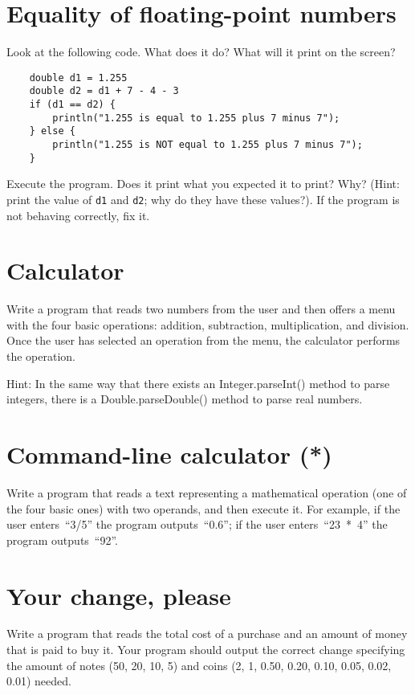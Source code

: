 \documentclass{article}
\begin{document}
\section{Equality of floating-point numbers}
\label{sec:eq}

Look at the following code. What does it do? What will it print on the screen?

\begin{verbatim}
    double d1 = 1.255
    double d2 = d1 + 7 - 4 - 3
    if (d1 == d2) {
        println("1.255 is equal to 1.255 plus 7 minus 7");
    } else {
        println("1.255 is NOT equal to 1.255 plus 7 minus 7");
    }
\end{verbatim}

Execute the program. Does it print what you expected it to print? Why?
(Hint: print the value of \verb+d1+ and \verb+d2+; why do they have
these values?). If the program is not behaving correctly, fix it. 

\section{Calculator}
\label{sec:calculator}

Write a program that reads two numbers from the user and then offers a
menu with the four basic operations: addition, subtraction,
multiplication, and division. Once the user has selected an operation
from the menu, the calculator performs the operation.

Hint: In the same way that there exists an Integer.parseInt() method
to parse integers, there is a Double.parseDouble() method to parse
real numbers. 

\section{Command-line calculator (*)}
\label{sec:comm-line-calc}

Write a program that reads a text representing a mathematical
operation (one of the four basic ones) with two operands, and then
execute it. For example, if the user enters~``3/5'' the program
outputs~``0.6''; if the user enters~``23~*~4'' the program
outputs~``92''.

\section{Your change, please}
\label{sec:your-change-please}

Write a program that reads the total cost of a purchase and an amount
of money that is paid to buy it. Your program should output the
correct change specifying the amount of notes (50, 20, 10, 5) and
coins (2, 1, 0.50, 0.20, 0.10, 0.05, 0.02, 0.01) needed. 
\end{document}
